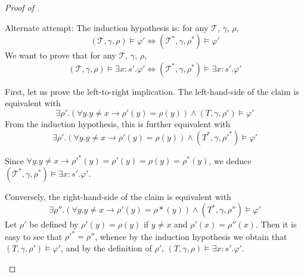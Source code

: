 \begin{proof}[Proof of ]
\begin{itemize}
    Alternate attempt:
    The induction hypothesis is: for any $\mathcal{T}$, $\gamma$, $\rho$, 
        $$(\mathcal{T}, \gamma, \rho) \vDash \varphi' \iff (\mathcal{T}^*, \gamma, \rho^\ast) \vDash \varphi'$$
    We want to prove that for any $\mathcal{T}$, $\gamma$, $\rho$, 
        $$(\mathcal{T}, \gamma, \rho) \vDash \exists x:s'. \varphi' \iff (\mathcal{T}^*, \gamma, \rho^\ast) \vDash \exists x:s'.\varphi'$$
    
    First, let us prove the left-to-right implication.
    The left-hand-side of the claim is equivalent with
    $$\exists \rho'. (\forall y. y \neq x \to \rho'(y) = \rho(y)) \wedge (T, \gamma, \rho') \vDash \varphi'$$
    From the induction hypothesis, this is further equivalent with
    $$\exists \rho'. (\forall y. y \neq x \to \rho'(y) = \rho(y)) \wedge (T^\ast, \gamma, {\rho'}^\ast) \vDash \varphi'$$
    
    Since $\forall y. y \neq x \to {\rho'}^\ast(y) = \rho'(y) = \rho(y) = \rho^\ast(y)$, we deduce $(\mathcal{T}^*, \gamma, \rho^\ast) \vDash \exists x:s'.\varphi'$.
    
    Conversely, the right-hand-side of the claim is equivalent with
    $$\exists \rho''. (\forall y. y \neq x \to \rho'(y) = \rho\ast(y)) \wedge (T^\ast, \gamma, \rho'') \vDash \varphi'$$
    Let $\rho'$ be defined by $\rho'(y) = \rho(y)$ if $y\neq x$ and $\rho'(x) = \rho''(x)$. Then it is
    easy to see that ${\rho'}^\ast = \rho''$, whence by the induction hypothesis we obtain that
    $(T, \gamma, \rho') \vDash \varphi'$, and by the definition of $\rho'$, $(T, \gamma, \rho) \vDash \exists x:s'. \varphi'$.
 \end{itemize}
\end{proof}

